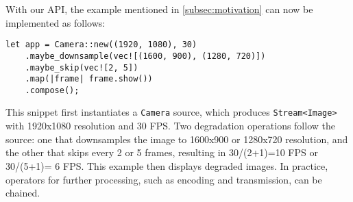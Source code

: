 With our API, the example mentioned in \autoref{subsec:motivation} can now be
implemented as follows:

\begin{lstlisting}[xleftmargin=.1\textwidth]
let app = Camera::new((1920, 1080), 30)
    .maybe_downsample(vec![(1600, 900), (1280, 720)])
    .maybe_skip(vec![2, 5])
    .map(|frame| frame.show())
    .compose();
\end{lstlisting}

This snippet first instantiates a \texttt{Camera} source, which produces
\texttt{Stream<Image>} with 1920x1080 resolution and 30 FPS\@. Two degradation
operations follow the source: one that downsamples the image to 1600x900 or
1280x720 resolution, and the other that skips every 2 or 5 frames, resulting in
30/(2+1)=10 FPS or 30/(5+1)= 6 FPS\@. This example then displays degraded
images. In practice, operators for further processing, such as encoding and
transmission, can be chained.


